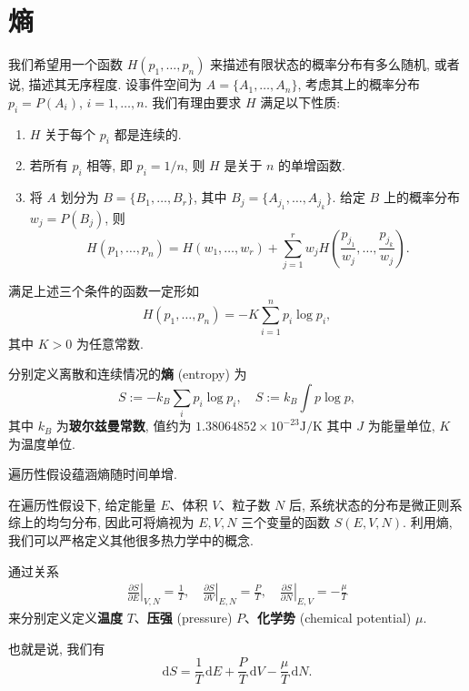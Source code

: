 \section{熵}
我们希望用一个函数 $ H(p_1,\dots,p_n) $ 来描述有限状态的概率分布有多么随机, 或者说, 描述其无序程度. 设事件空间为 $ A=\{A_1,\dots,A_n\} $, 考虑其上的概率分布 $ p_i=P(A_i) $, $ i=1,\dots,n $. 我们有理由要求 $ H $ 满足以下性质:
\begin{enumerate}
    \item $ H $ 关于每个 $ p_i $ 都是连续的.
    \item 若所有 $ p_i $ 相等, 即 $ p_i=1/n $, 则 $ H $ 是关于 $ n $ 的单增函数.
    \item 将 $ A $ 划分为 $ B=\{B_1,\dots,B_r\} $, 其中 $ B_j=\{A_{j_1},\dots,A_{j_k}\} $. 给定 $ B $ 上的概率分布 $ w_j=P(B_j) $, 则
    \[ H(p_1,\dots,p_n)=H(w_1,\dots,w_r)+\sum_{j=1}^{r}w_j H\left( \frac{p_{j_1}}{w_j},\dots,\frac{p_{j_k}}{w_j} \right). \]
\end{enumerate}
\begin{theorem}
    满足上述三个条件的函数一定形如
    \[ H(p_1,\dots,p_n)=-K\sum_{i=1}^{n}p_i\log p_i, \]
    其中 $ K>0 $ 为任意常数.
\end{theorem}

\begin{definition}[熵]
    分别定义离散和连续情况的{\bf 熵} (entropy) 为
    \[ S:=-k_B\sum_{i}p_i\log p_i, \quad S:=k_B\int p\log p, \]
    其中 $ k_B $ 为{\bf 玻尔兹曼常数}, 值约为 $ 1.38064852\times 10^{-23}\mathrm{J}/\mathrm{K} $ 其中 $ J $ 为能量单位, $ K $ 为温度单位.
\end{definition}
\begin{remark}
    遍历性假设蕴涵熵随时间单增.
\end{remark}

在遍历性假设下, 给定能量 $ E $、体积 $ V $、粒子数 $ N $ 后, 系统状态的分布是微正则系综上的均匀分布, 因此可将熵视为 $ E,V,N $ 三个变量的函数 $ S(E,V,N) $. 利用熵, 我们可以严格定义其他很多热力学中的概念.
\begin{definition}
    通过关系
    \begin{align*}
        \left.\frac{\partial S}{\partial E}\right|_{V,N}=\frac{1}{T},\quad \left.\frac{\partial S}{\partial V}\right|_{E,N}=\frac{P}{T},\quad \left.\frac{\partial S}{\partial N}\right|_{E,V}=-\frac{\mu}{T}
    \end{align*}
    来分别定义定义{\bf 温度} $ T $、{\bf 压强} (pressure) $ P $、{\bf 化学势} (chemical potential) $ \mu $. 
    
    也就是说, 我们有 
    \[ \mathrm{d}S=\frac{1}{T}\,\mathrm{d}E+\frac{P}{T}\,\mathrm{d}V-\frac{\mu}{T}\,\mathrm{d}N. \]
\end{definition}

